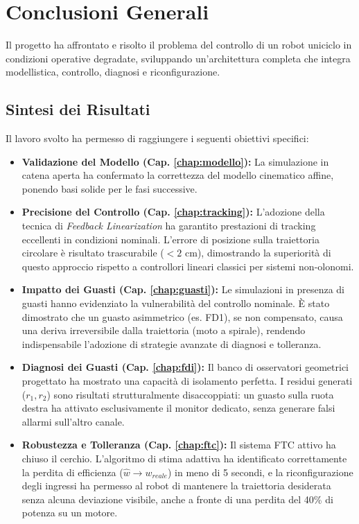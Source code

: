 \chapter{Conclusioni Generali} \label{chap:conclusioni}

Il progetto ha affrontato e risolto il problema del controllo di un robot uniciclo in condizioni operative degradate, sviluppando un'architettura completa che integra modellistica, controllo, diagnosi e riconfigurazione.

\section{Sintesi dei Risultati}
Il lavoro svolto ha permesso di raggiungere i seguenti obiettivi specifici:

\begin{itemize}
    \item \textbf{Validazione del Modello (Cap. \ref{chap:modello}):} La simulazione in catena aperta ha confermato la correttezza del modello cinematico affine, ponendo basi solide per le fasi successive.
    
    \item \textbf{Precisione del Controllo (Cap. \ref{chap:tracking}):} L'adozione della tecnica di \textit{Feedback Linearization} ha garantito prestazioni di tracking eccellenti in condizioni nominali. L'errore di posizione sulla traiettoria circolare è risultato trascurabile (\( < 2 \) cm), dimostrando la superiorità di questo approccio rispetto a controllori lineari classici per sistemi non-olonomi.
    
    \item \textbf{Impatto dei Guasti (Cap. \ref{chap:guasti}):} Le simulazioni in presenza di guasti hanno evidenziato la vulnerabilità del controllo nominale. È stato dimostrato che un guasto asimmetrico (es. FD1), se non compensato, causa una deriva irreversibile dalla traiettoria (moto a spirale), rendendo indispensabile l'adozione di strategie avanzate di diagnosi e tolleranza.
    
    \item \textbf{Diagnosi dei Guasti (Cap. \ref{chap:fdi}):} Il banco di osservatori geometrici progettato ha mostrato una capacità di isolamento perfetta. I residui generati (\( r_1, r_2 \)) sono risultati strutturalmente disaccoppiati: un guasto sulla ruota destra ha attivato esclusivamente il monitor dedicato, senza generare falsi allarmi sull'altro canale.
    
    \item \textbf{Robustezza e Tolleranza (Cap. \ref{chap:ftc}):} Il sistema FTC attivo ha chiuso il cerchio. L'algoritmo di stima adattiva ha identificato correttamente la perdita di efficienza (\( \hat{w} \to w_{reale} \)) in meno di 5 secondi, e la riconfigurazione degli ingressi ha permesso al robot di mantenere la traiettoria desiderata senza alcuna deviazione visibile, anche a fronte di una perdita del 40\% di potenza su un motore.
\end{itemize}


